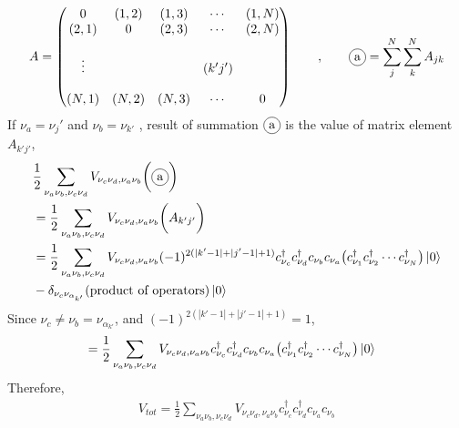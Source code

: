 \documentclass{article}
\newcommand\encircle[1]{%
    \tikz[baseline=(X.base)] 
      \node (X) [draw, shape=circle, inner sep=0] {\strut #1};}
\begin{document}
\begin{align*}
    A= \left(
        \begin{matrix}
            0 & (1,2) & (1,3) & \cdots & (1,N) \\
            (2,1) & 0 & (2,3) & \cdots & (2,N) \\
            \\
            \vdots & & &(k'j') & \\
            \\
            (N,1) & (N,2) & (N,3) & \cdots & 0 \\
        \end{matrix}
      \right)
    \qquad , \qquad \encircle{a} = \sum_{j}^{N}\sum_{k}^{N} A_{jk} \end{align*}
If $\nu_a=\nu_{j}'$ and $\nu_b = \nu_{k'}$ , result of summation ${\encircle{a}}$ is the value of matrix element $A_{k'j'}$,
\begin{align*}
    &\frac{1}{2}\sum_{\nu_a\nu_b,\nu_c \nu_d} V_{\nu_c\nu_d,\nu_a \nu_b}\bigg(\encircle{a}\bigg) \\ 
    &=\frac{1}{2}\sum_{\nu_a\nu_b,\nu_c \nu_d} V_{\nu_c\nu_d,\nu_a \nu_b}\bigg( A_{k'j'} \bigg) \\
    &=\frac{1}{2}\sum_{\nu_a\nu_b,\nu_c \nu_d} V_{\nu_c\nu_d,\nu_a \nu_b}(-1)^{2(|k'-1|+|j'-1|+1)}c^{\dagger}_{\nu_c}c^{\dagger}_{\nu_d} c_{\nu_b}c_{\nu_a}\big(c^{\dagger}_{\nu_1}c^{\dagger}_{\nu_2} \cdots c^{\dagger}_{\nu_N}\big) \ket{0}\\
    & - \delta_{\nu_c \nu_{\alpha_{k'}}}(\text{product of operators})\ket{0}
\end{align*}
Since $\nu_c \neq \nu_b =\nu_{\alpha_{k'}}$, and $(-1)^{2(|k'-1|+|j'-1|+1)}=1$,
\begin{align*}
    &=\frac{1}{2}\sum_{\nu_a\nu_b,\nu_c \nu_d} V_{\nu_c\nu_d,\nu_a \nu_b} c^{\dagger}_{\nu_c}c^{\dagger}_{\nu_d} c_{\nu_b}c_{\nu_a}\big(c^{\dagger}_{\nu_1}c^{\dagger}_{\nu_2} \cdots c^{\dagger}_{\nu_N}\big) \ket{0}
\end{align*}
Therefore,
\begin{align*}
    V_{tot}=\frac{1}{2}\sum_{\nu_a\nu_b,\nu_c \nu_d} V_{\nu_c\nu_d,\nu_a \nu_b}c^{\dagger}_{\nu_c}c^{\dagger}_{\nu_d}c_{\nu_a}c_{\nu_b}
\end{align*}
\end{document}
